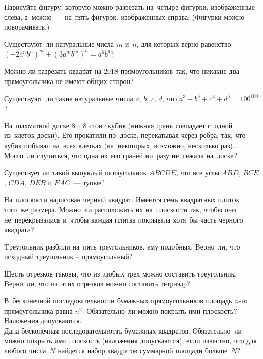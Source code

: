 \resetproblem \begingroup %
    \def\jeolmdate{24 октября 2018}%
\jeolmheader \endgroup


\begin{problems}

\item
Нарисуйте фигуру, которую можно разрезать на~четыре фигурки, изображенные
слева, а~можно~--- на~пять фигурок, изображенных справа.
(Фигурки можно поворачивать.)
\begin{center}
\qquad
\end{center}

\item
Существуют~ли натуральные числа $m$ и~$n$, для которых верно равенство:
$(-2 a^n b^n)^m + (3 a^m b^m)^n = a^6 b^6$?

\item Можно ли разрезать квадрат на $2018$ прямоугольников так, что никакие два прямоугольника не имеют общих сторон? 

\item
Существуют~ли такие натуральные числа $a$, $b$, $c$, $d$, что
$a^3 + b^3 + c^3 + d^3 = 100^{100}$?

\item
На~шахматной доске $8 \times 8$ стоит кубик
(нижняя грань совпадает с~одной из~клеток доски).
Его прокатили по~доске, перекатывая через ребра, так, что кубик побывал на~всех
клетках (на~некоторых, возможно, несколько раз).
Могло~ли случиться, что одна из~его граней ни~разу не~лежала на~доске?

\item Существует ли такой выпуклый пятиугольник $ABCDE$, что все углы $ABD$, $BCE$, $CDA$, $DEB$ и $EAC$~--- тупые?

\item
На~плоскости нарисован черный квадрат.
Имеется семь квадратных плиток того~же размера.
Можно~ли расположить их на~плоскости так, чтобы они не~перекрывались и~чтобы
каждая плитка покрывала хотя~бы часть черного квадрата?

\item
Tреугольник разбили на~пять треугольников, ему подобных.
Bерно~ли, что исходный треугольник -- прямоугольный?

\item
Шесть отрезков таковы, что из~любых трех можно составить треугольник.
Bерно~ли, что из~этих отрезков можно составить тетраэдр?

\item
\subproblem
В~бесконечной последовательности бумажных прямоугольников площадь $n$-го
прямоугольника равна $n^2$.
Обязательно~ли можно покрыть ими плоскость?
Наложения допускаются.
\\
\subproblem
Дана бесконечная последовательность бумажных квадратов.
Обязательно~ли можно покрыть ими плоскость (наложения допускаются), если
известно, что для любого числа~$N$ найдется набор квадратов суммарной площади
больше~$N$?

\end{problems}

